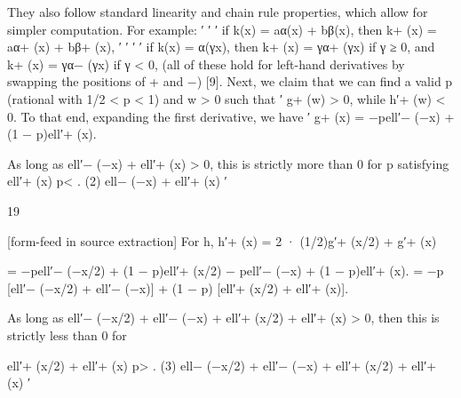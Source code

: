 \documentclass[10pt]{article}
\begin{document}
\begin{ReviewVerbatim}
They also follow standard linearity and chain rule properties, which allow for simpler computation.
For example:
                                      ′         ′         ′
       if k(x) = aα(x) + bβ(x), then k+ (x) = aα+ (x) + bβ+ (x),
                              ′         ′                     ′         ′
       if k(x) = α(γx), then k+ (x) = γα+ (γx) if γ ≥ 0, and k+ (x) = γα− (γx) if γ < 0,
(all of these hold for left-hand derivatives by swapping the positions of + and −) [9].
Next, we claim that we can find a valid p (rational with 1/2 < p < 1) and w > 0 such that
 ′
g+ (w) > 0, while h′+ (w) < 0. To that end, expanding the first derivative, we have
                                 ′
                                g+ (x) = −pell′− (−x) + (1 − p)ell′+ (x).


As long as ell′− (−x) + ell′+ (x) > 0, this is strictly more than 0 for p satisfying
                                                   ell′+ (x)
                                         p<                     .                                      (2)
                                              ell− (−x) + ell′+ (x)
                                               ′



                                                    19

[form-feed in source extraction]
For h,
              h′+ (x) = 2 · (1/2)g′+ (x/2) + g′+ (x)


                      = −pell′− (−x/2) + (1 − p)ell′+ (x/2) − pell′− (−x) + (1 − p)ell′+ (x).
                      = −p [ell′− (−x/2) + ell′− (−x)] + (1 − p) [ell′+ (x/2) + ell′+ (x)].


As long as ell′− (−x/2) + ell′− (−x) + ell′+ (x/2) + ell′+ (x) > 0, then this is strictly less than 0 for

                                            ell′+ (x/2) + ell′+ (x)
                           p>                                               .                           (3)
                                 ell− (−x/2) + ell′− (−x) + ell′+ (x/2) + ell′+ (x)
                                  ′


\end{ReviewVerbatim}
\end{document}
